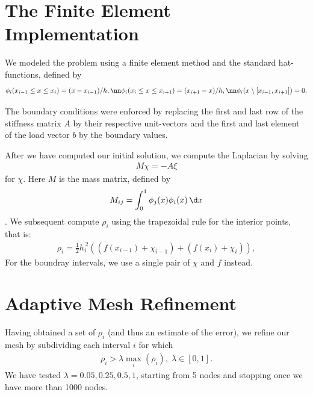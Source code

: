 \section{The Finite Element Implementation}
We modeled the problem using a finite element method and the standard hat-functions, defined by
\begin{align}
 \phi_i(x_{i-1} \leq x \leq x_i) = (x-x_{i-1})/h,\nn
 \phi_i(x_{i} \leq x \leq x_{i+1}) = (x_{i+1}-x)/h,\nn
 \phi_i(x \setminus [x_{i-1}, x_{i+1}]) = 0.
\end{align}
\par The boundary conditions were enforced by replacing
the first and last row of the stiffness matrix $A$ by their respective unit-vectors
 and the first and last element of the load vector $b$ by the boundary values.
 \par After we have computed our initial solution, we compute the Laplacian by solving
 \begin{align}
   M\chi = -A \xi
 \end{align}
for $\chi$. Here $M$ is the mass matrix, defined by
\begin{align}
 M_{ij} = \int_0^1 \phi_j(x)\phi_i(x)\,\d x
\end{align}.
We subsequent compute $\rho_i$ using the trapezoidal rule for the interior points, that is:
\begin{align}
  \rho_i = \frac{1}{2}h_i^{\,2}\left((f(x_{i-1})+\chi_{i-1})+(f(x_i)+\chi_i)\right),
\end{align}
For the boundray intervals, we use a single pair of $\chi$ and $f$ instead.

\section{Adaptive Mesh Refinement}
Having obtained a set of $\rho_i$ (and thus an estimate of the error), we refine our mesh by subdividing each interval $i$ for which
\begin{align}
 \rho_i > \lambda \max_{i}(\rho_i),\;\lambda \in [0, 1].
\end{align}
We have tested $\lambda = 0.05, 0.25, 0.5, 1$, starting from 5 nodes and stopping once we have more than 1000 nodes.

